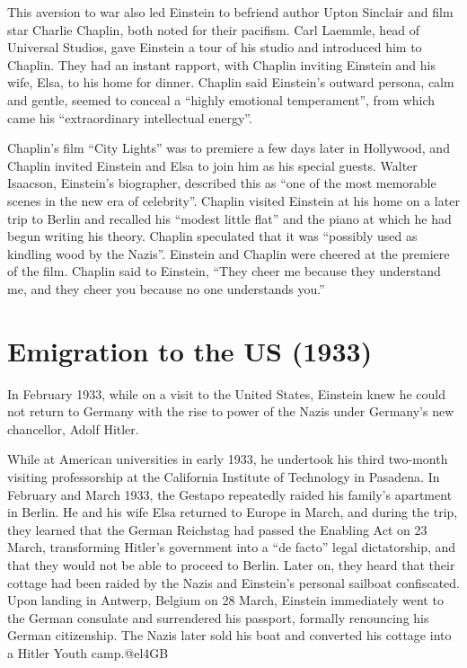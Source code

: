 \documentclass[twoside]{memoir}
\begin{document}
This aversion to war also led Einstein to befriend author Upton Sinclair and film star Charlie Chaplin, both noted for their pacifism. Carl Laemmle, head of Universal Studios, gave Einstein a tour of his studio and introduced him to Chaplin. They had an instant rapport, with Chaplin inviting Einstein and his wife, Elsa, to his home for dinner. Chaplin said Einstein's outward persona, calm and gentle, seemed to conceal a \enquote{highly emotional temperament}, from which came his \enquote{extraordinary intellectual energy}.

Chaplin's film \enquote{City Lights} was to premiere a few days later in Hollywood, and Chaplin invited Einstein and Elsa to join him as his special guests. Walter Isaacson, Einstein's biographer, described this as \enquote{one of the most memorable scenes in the new era of celebrity}. Chaplin visited Einstein at his home on a later trip to Berlin and recalled his \enquote{modest little flat} and the piano at which he had begun writing his theory. Chaplin speculated that it was \enquote{possibly used as kindling wood by the Nazis}. Einstein and Chaplin were cheered at the premiere of the film. Chaplin said to Einstein, \enquote{They cheer me because they understand me, and they cheer you because no one understands you.}
\chapter{Emigration to the US (1933)}
In February 1933, while on a visit to the United States, Einstein knew he could not return to Germany with the rise to power of the Nazis under Germany's new chancellor, Adolf Hitler.

While at American universities in early 1933, he undertook his third two-month visiting professorship at the California Institute of Technology in Pasadena. In February and March 1933, the Gestapo repeatedly raided his family's apartment in Berlin. He and his wife Elsa returned to Europe in March, and during the trip, they learned that the German Reichstag had passed the Enabling Act on 23 March, transforming Hitler's government into a \enquote{de facto} legal dictatorship, and that they would not be able to proceed to Berlin. Later on, they heard that their cottage had been raided by the Nazis and Einstein's personal sailboat confiscated. Upon landing in Antwerp, Belgium on 28 March, Einstein immediately went to the German consulate and surrendered his passport, formally renouncing his German citizenship. The Nazis later sold his boat and converted his cottage into a Hitler Youth camp.@el4GB
\end{document}
